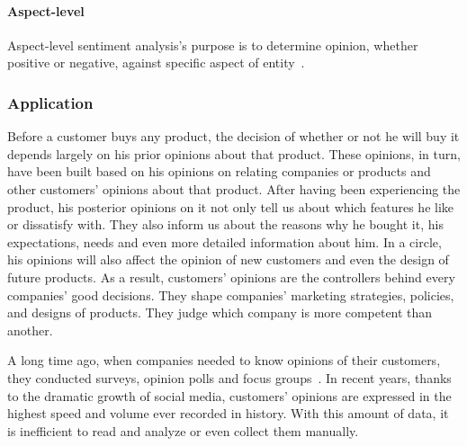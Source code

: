 \paragraph{Aspect-level}
Aspect-level  sentiment analysis's purpose is to determine opinion, whether positive or negative, against specific aspect of entity~\cite{liu2012sentiment}.

\subsubsection{Application}
Before a customer buys any product, the decision of whether or not he will buy it depends largely on his prior opinions about that product. 
These opinions, in turn, have been built based on his opinions on relating companies or products and other customers' opinions about that product.  
After having been experiencing the product, his posterior opinions on it not only tell us about which features he like or dissatisfy with.
They also inform us about the reasons why he bought it, his expectations, needs and even more detailed information about him.
In a circle, his opinions will also affect the opinion of new customers and even the design of future products.
As a result, customers' opinions are the controllers behind every companies' good decisions. 
They shape companies' marketing strategies, policies, and designs of products.
They judge which company is more competent than another.

A long time ago, when companies needed to know opinions of their customers, they conducted surveys, opinion polls and focus groups~\cite{liu2012sentiment}. 
In recent years, thanks to the dramatic growth of social media, customers' opinions are expressed in the highest speed and volume ever recorded in history.
With this amount of data, it is inefficient to read and analyze or even collect them manually.



